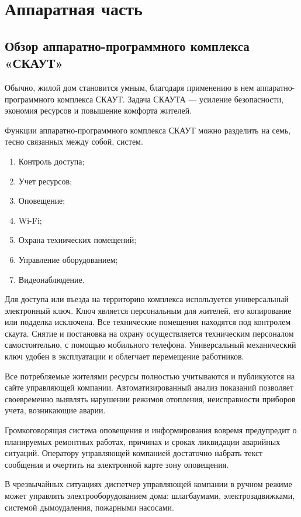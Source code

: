 
\section{Аппаратная часть}
\subsection{Обзор аппаратно-программного комплекса «СКАУТ»}
Обычно, жилой дом становится умным, благодаря применению в нем аппаратно-программного комплекса СКАУТ. Задача СКАУТА --- усиление безопасности, экономия ресурсов и повышение комфорта жителей. \cite{Almanah}

Функции аппаратно-программного комплекса СКАУТ можно разделить на семь, тесно связанных между собой, систем.
\begin{enumerate}
	\item Контроль доступа; 
	\item Учет ресурсов;
	\item Оповещение;
	\item Wi-Fi;
	\item Охрана технических помещений;
	\item Управление оборудованием;
	\item Видеонаблюдение.
\end{enumerate} 

Для доступа или въезда на территорию комплекса используется универсальный электронный ключ. Ключ является персональным для жителей, его копирование или подделка исключена. Все технические помещения находятся под контролем скаута. Снятие и постановка на охрану осуществляется техническим персоналом самостоятельно, с помощью мобильного телефона. Универсальный механический ключ удобен в эксплуатации и облегчает перемещение работников. 

Все потребляемые жителями ресурсы полностью учитываются и публикуются на сайте управляющей компании. Автоматизированный анализ показаний позволяет своевременно выявлять нарушении режимов отопления, неисправности приборов учета, возникающие аварии. 

Громкоговорящая система оповещения и информирования вовремя предупредит о планируемых ремонтных работах, причинах и сроках ликвидации аварийных ситуаций. Оператору управляющей компанией достаточно набрать текст сообщения и очертить на электронной карте зону оповещения. 

В чрезвычайных ситуациях диспетчер управляющей компании в ручном режиме может управлять электрооборудованием дома: шлагбаумами, электрозадвижками, системой дымоудаления, пожарными насосами.

